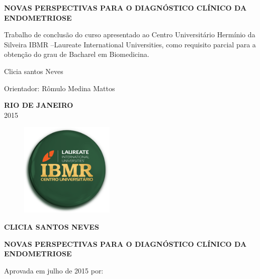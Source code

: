 \documentclass[12pt]{article} %
\begin{document}
\begin{center}
\MakeUppercase{\textbf{Novas perspectivas para o diagnóstico clínico da endometriose}}
\end{center}

\vspace{4.5cm}
Trabalho de conclusão do curso apresentado ao Centro Universitário Hermínio da Silveira IBMR  –Laureate International Universities, como requisito parcial para a obtenção do grau de Bacharel em Biomedicina.

\vspace{2.5cm}

Clicia santos Neves

\vspace{2.5cm}

Orientador: Rômulo Medina Mattos

\vspace{2.0cm}
\begin{center}
\MakeUppercase{\textbf{Rio de Janeiro}}\\
2015
\end{center}

\newpage


\begin{figure}[h!]
\centering
\includegraphics[width=4.5cm]{ibmr.png}
\end{figure}


\begin{center}
\MakeUppercase{\textbf{Clicia Santos Neves}}
\end{center}

\vspace{2.0cm}

\begin{center}
\MakeUppercase{\textbf{Novas perspectivas para o diagnóstico clínico da endometriose}}
\end{center}

\vspace{2.0cm}

Aprovada em julho de 2015 por:

\vspace{9.0cm}
\end{document}
